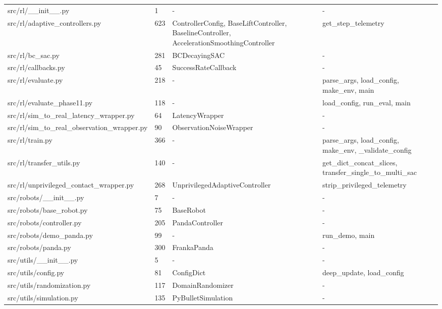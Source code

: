 \documentclass[11pt,a4paper,oneside]{book}
\begin{document}
\begin{longtable}{l l l l}
src/rl/\_\_init\_\_.py & 1 & - & - \\
src/rl/adaptive\_controllers.py & 623 & ControllerConfig, BaseLiftController, BaselineController, AccelerationSmoothingController & get\_step\_telemetry \\
src/rl/bc\_sac.py & 281 & BCDecayingSAC & - \\
src/rl/callbacks.py & 45 & SuccessRateCallback & - \\
src/rl/evaluate.py & 218 & - & parse\_args, load\_config, make\_env, main \\
src/rl/evaluate\_phase11.py & 118 & - & load\_config, run\_eval, main \\
src/rl/sim\_to\_real\_latency\_wrapper.py & 64 & LatencyWrapper & - \\
src/rl/sim\_to\_real\_observation\_wrapper.py & 90 & ObservationNoiseWrapper & - \\
src/rl/train.py & 366 & - & parse\_args, load\_config, make\_env, \_validate\_config \\
src/rl/transfer\_utils.py & 140 & - & get\_dict\_concat\_slices, transfer\_single\_to\_multi\_sac \\
src/rl/unprivileged\_contact\_wrapper.py & 268 & UnprivilegedAdaptiveController & strip\_privileged\_telemetry \\
src/robots/\_\_init\_\_.py & 7 & - & - \\
src/robots/base\_robot.py & 75 & BaseRobot & - \\
src/robots/controller.py & 205 & PandaController & - \\
src/robots/demo\_panda.py & 99 & - & run\_demo, main \\
src/robots/panda.py & 300 & FrankaPanda & - \\
src/utils/\_\_init\_\_.py & 5 & - & - \\
src/utils/config.py & 81 & ConfigDict & deep\_update, load\_config \\
src/utils/randomization.py & 117 & DomainRandomizer & - \\
src/utils/simulation.py & 135 & PyBulletSimulation & - \\
\bottomrule \end{longtable}
\end{document}
